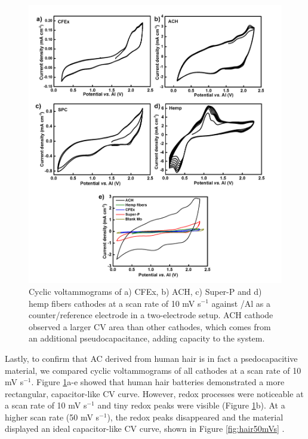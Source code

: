 \documentclass{article}
\begin{document}
 \begin{figure}[h!]
  \centering
  \includegraphics[width=\textwidth]{fig/CV}
    \caption{Cyclic voltammograms of a) CFEx, b) ACH, c) Super-P and d) hemp fibers cathodes at a scan rate of 10 mV s$^{-1}$ against /Al as a counter/reference electrode in a two-electrode setup. ACH cathode observed a larger CV area than other cathodes, which comes from an additional pseudocapacitance, adding capacity to the system.}
  \label{fig:CV}
\end{figure}

Lastly, to confirm that AC derived from human hair is in fact a psedocapacitive material, we compared cyclic voltammograms of all cathodes at a scan rate of 10 mV s$^{-1}$. Figure \ref{fig:CV}a-e showed that human hair batteries demonstrated a more rectangular, capacitor-like CV curve. However, redox processes were noticeable at a scan rate of 10 mV s$^{-1}$ and tiny redox peaks were visible (Figure \ref{fig:CV}b). At a higher scan rate (50 mV s$^{-1}$), the redox peaks disappeared and the material displayed an ideal capacitor-like CV curve, shown in Figure \ref{fig:hair50mVs} \cite{guan_capacitive_2016, dupont_separating_2015}. 
\end{document}
